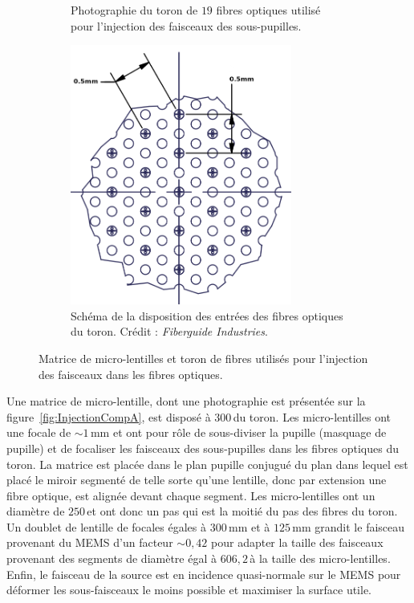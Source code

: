 \begin{figure}[ht!]
\begin{subfigure}[t]{0.5\textwidth}
        \caption{Photographie du toron de $19$ fibres optiques utilisé pour l'injection des faisceaux des sous-pupilles.}
        \label{fig:InjectionCompB}
    \end{subfigure}%
    \begin{subfigure}[t]{0.5\textwidth}
        \centering
        \includegraphics[width=0.8\textwidth]{Figure_Chap2/FiberBundle_Scheme.png}
        \caption{Schéma de la disposition des entrées des fibres optiques du toron. Crédit : \textit{Fiberguide Industries}.}
        \label{fig:InjectionCompC}
    \end{subfigure}
    \caption[Matrice de micro-lentilles et toron de fibres utilisés pour l'injection des faisceaux dans les fibres optiques.]{Matrice de micro-lentilles et toron de fibres utilisés pour l'injection des faisceaux dans les fibres optiques.}
    \label{fig:InjectionComp}
\end{figure}

Une matrice de micro-lentille, dont une photographie est présentée sur la figure~\ref{fig:InjectionCompA}, est disposé à $300 \,$\um du toron. Les micro-lentilles ont une focale de $\sim 1 \,$mm et ont pour rôle de sous-diviser la pupille (masquage de pupille) et de focaliser les faisceaux des sous-pupilles dans les fibres optiques du toron. La matrice est placée dans le plan pupille conjugué du plan dans lequel est placé le miroir segmenté de telle sorte qu'une lentille, donc par extension une fibre optique, est alignée devant chaque segment. Les micro-lentilles ont un diamètre de $250 \,$\um et ont donc un pas qui est la moitié du pas des fibres du toron. Un doublet de lentille de focales égales à $300 \,$mm et à $125 \,$mm grandit le faisceau provenant du \ac{MEMS} d'un facteur $\sim 0,42$ pour adapter la taille des faisceaux provenant des segments de diamètre égal à $606,2 \,$\um à la taille des micro-lentilles. Enfin, le faisceau de la source est en incidence quasi-normale sur le \ac{MEMS} pour déformer les sous-faisceaux le moins possible et maximiser la surface utile.



